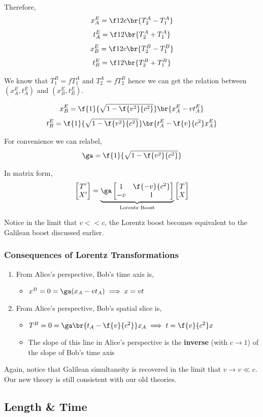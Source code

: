 \documentclass{article}
\newcommand{\mtrx}[1]{
    \begin{bmatrix}
    #1
    \end{bmatrix}
}
\begin{document}
Therefore,
\[ x_A^E = \f12 c \br{T_2^A - T_1^A} \]
\[ t_A^E = \f12 \br{T_2^A + T_1^A} \]
\[ x_B^E = \f12 c \br{T_2^B - T_1^B} \]
\[ t_B^E = \f12 \br{T_2^B + T_1^B} \]

We know that $T_1^B = f T_1^A$ and $T_2^A = f T_2^B$ hence we can get the relation between $(x_A^E, t_A^E)$ and $(x_B^E, t_B^E)$.

\[ x_B^E = \f{1}{\sqrt{1 - \f{v^2}{c^2}}} \br{x_A^E - vt_A^E} \]
\[ t_B^E = \f{1}{\sqrt{1 - \f{v^2}{c^2}}} \br{t_A^E - \f{v}{c^2}x_A^E} \]

For convenience we can relabel,
\[ \ga =  \f{1}{\sqrt{1 - \f{v^2}{c^2}}} \]

In matrix form,
\[ \mtrx{T' \\ X'} = \underbrace{\ga \mtrx{1 & \f{-v}{c^2} \\ -v & 1}}_{\text{Lorentz Boost}} \mtrx{T \\ X}\]

Notice in the limit that $v << c$, the Lorentz boost becomes equivalent to the Galilean boost discussed earlier.

\subsubsection{Consequences of Lorentz Transformations}

\begin{enumerate}
    \item From Alice's perspective, Bob's time axis is,
    \begin{itemize}
        \item $x^B = 0 = \ga (x_A - vt_A) \implies x = vt$
    \end{itemize}
    \item From Alice's perspective, Bob's spatial slice is,
    \begin{itemize}
        \item $T^B = 0 = \ga \br{t_A - \f{v}{c^2}} x_A \implies t = \f{v}{c^2} x$
        \item The slope of this line in Alice's perspective is the \textbf{inverse} (with $c \to 1$) of the slope of Bob's time axis
    \end{itemize}
\end{enumerate}

Again, notice that Galilean simultaneity is recovered in the limit that $v \to v \ll c$. Our new theory is still consistent with our old theories.

\subsection{Length \& Time}
\end{document}
